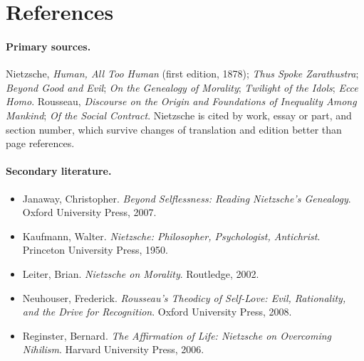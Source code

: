 \documentclass[11pt]{article}
\theoremstyle{definition}
\begin{document}
\section*{References}

\paragraph{Primary sources.} Nietzsche, \emph{Human, All Too Human} (first edition, 1878); \emph{Thus Spoke Zarathustra}; \emph{Beyond Good and Evil}; \emph{On the Genealogy of Morality}; \emph{Twilight of the Idols}; \emph{Ecce Homo}. Rousseau, \emph{Discourse on the Origin and Foundations of Inequality Among Mankind}; \emph{Of the Social Contract}. Nietzsche is cited by work, essay or part, and section number, which survive changes of translation and edition better than page references.

\paragraph{Secondary literature.}
\begin{itemize}
\item Janaway, Christopher. \emph{Beyond Selflessness: Reading Nietzsche's Genealogy}. Oxford University Press, 2007.
\item Kaufmann, Walter. \emph{Nietzsche: Philosopher, Psychologist, Antichrist}. Princeton University Press, 1950.
\item Leiter, Brian. \emph{Nietzsche on Morality}. Routledge, 2002.
\item Neuhouser, Frederick. \emph{Rousseau's Theodicy of Self-Love: Evil, Rationality, and the Drive for Recognition}. Oxford University Press, 2008.
\item Reginster, Bernard. \emph{The Affirmation of Life: Nietzsche on Overcoming Nihilism}. Harvard University Press, 2006.
\end{itemize}
\end{document}
